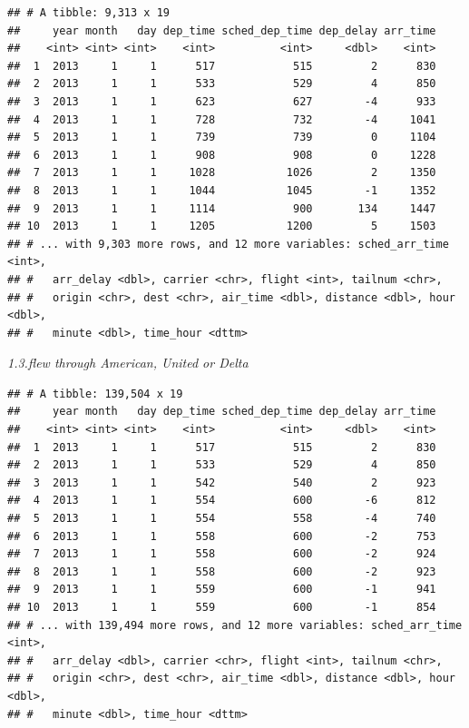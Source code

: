 \documentclass[]{book}
\newenvironment{Shaded}{\begin{snugshade}}{\end{snugshade}}
\newcommand{\KeywordTok}[1]{\textcolor[rgb]{0.13,0.29,0.53}{\textbf{#1}}}
\newcommand{\NormalTok}[1]{#1}
\newcommand{\OperatorTok}[1]{\textcolor[rgb]{0.81,0.36,0.00}{\textbf{#1}}}
\newcommand{\StringTok}[1]{\textcolor[rgb]{0.31,0.60,0.02}{#1}}
\theoremstyle{definition}
\theoremstyle{definition}
\theoremstyle{definition}
\theoremstyle{remark}
\begin{document}
\begin{verbatim}
## # A tibble: 9,313 x 19
##     year month   day dep_time sched_dep_time dep_delay arr_time
##    <int> <int> <int>    <int>          <int>     <dbl>    <int>
##  1  2013     1     1      517            515         2      830
##  2  2013     1     1      533            529         4      850
##  3  2013     1     1      623            627        -4      933
##  4  2013     1     1      728            732        -4     1041
##  5  2013     1     1      739            739         0     1104
##  6  2013     1     1      908            908         0     1228
##  7  2013     1     1     1028           1026         2     1350
##  8  2013     1     1     1044           1045        -1     1352
##  9  2013     1     1     1114            900       134     1447
## 10  2013     1     1     1205           1200         5     1503
## # ... with 9,303 more rows, and 12 more variables: sched_arr_time <int>,
## #   arr_delay <dbl>, carrier <chr>, flight <int>, tailnum <chr>,
## #   origin <chr>, dest <chr>, air_time <dbl>, distance <dbl>, hour <dbl>,
## #   minute <dbl>, time_hour <dttm>
\end{verbatim}

\emph{1.3.flew through American, United or Delta}

\begin{Shaded}
\end{Shaded}

\begin{verbatim}
## # A tibble: 139,504 x 19
##     year month   day dep_time sched_dep_time dep_delay arr_time
##    <int> <int> <int>    <int>          <int>     <dbl>    <int>
##  1  2013     1     1      517            515         2      830
##  2  2013     1     1      533            529         4      850
##  3  2013     1     1      542            540         2      923
##  4  2013     1     1      554            600        -6      812
##  5  2013     1     1      554            558        -4      740
##  6  2013     1     1      558            600        -2      753
##  7  2013     1     1      558            600        -2      924
##  8  2013     1     1      558            600        -2      923
##  9  2013     1     1      559            600        -1      941
## 10  2013     1     1      559            600        -1      854
## # ... with 139,494 more rows, and 12 more variables: sched_arr_time <int>,
## #   arr_delay <dbl>, carrier <chr>, flight <int>, tailnum <chr>,
## #   origin <chr>, dest <chr>, air_time <dbl>, distance <dbl>, hour <dbl>,
## #   minute <dbl>, time_hour <dttm>
\end{verbatim}
\end{document}
